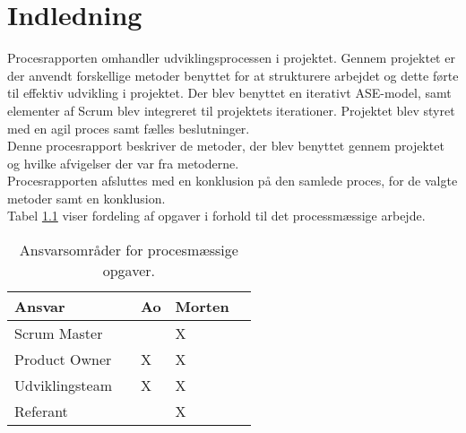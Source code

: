 \chapter{Indledning}
Procesrapporten omhandler udviklingsprocessen i projektet. Gennem projektet er der anvendt
forskellige metoder benyttet for at strukturere arbejdet og dette førte til effektiv
udvikling i projektet.
Der blev benyttet en iterativt ASE-model, samt elementer af Scrum blev integreret til projektets iterationer.
Projektet blev styret med en agil proces samt fælles beslutninger. \\
Denne procesrapport beskriver de metoder, der blev benyttet gennem
projektet og hvilke afvigelser der var fra metoderne. \\ 
Procesrapporten afsluttes med en konklusion på den samlede proces, for de valgte metoder samt en konklusion. \\
Tabel \ref{ProcessTabel} viser fordeling af opgaver i forhold til det processmæssige arbejde.

\begin{table}[H]
	\centering
	\begin{tabular}{lllll} \hline
		\textbf{Ansvar} &  & \textbf{Ao}&  \textbf{Morten}&  \\ \hline
		Scrum Master&  &  &  X&  \\ \hline
		Product Owner&  &  X&  X& \\ \hline
		Udviklingsteam& & X& X& \\  \hline
		Referant& & & X& \\ \hline
	\end{tabular}
	\caption{Ansvarsområder for procesmæssige opgaver.}
	\label{ProcessTabel}
\end{table}
